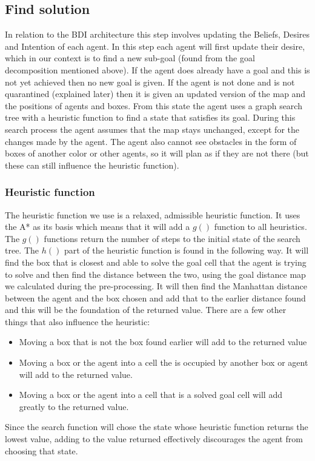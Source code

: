 \documentclass[letterpaper]{article}
\begin{document}
\subsection{Find solution}
In relation to the BDI architecture this step involves updating the Beliefs, Desires and Intention of each agent. In this step each agent will first update their desire, which in our context is to find a new sub-goal (found from the goal decomposition mentioned above). If the agent does already have a goal and this is not yet achieved then no new goal is given. If the agent is not done and is not quarantined (explained later) then it is given an updated version of the map and the positions of agents and boxes. From this state the agent uses a graph search tree with a heuristic function to find a state that satisfies its goal. During this search process the agent assumes that the map stays unchanged, except for the changes made by the agent. The agent also cannot see obstacles in the form of boxes of another color or other agents, so it will plan as if they are not there (but these can still influence the heuristic function).

\subsubsection{Heuristic function}
The heuristic function we use is a relaxed, admissible heuristic function. It uses the A* as its basis which means that it will add a $g()$ function to all heuristics. The $g()$ functions return the number of steps to the initial state of the search tree. The $h()$ part of the heuristic function is found in the following way. It will find the box that is closest and able to solve the goal cell that the agent is trying to solve and then find the distance between the two, using the goal distance map we calculated during the pre-processing. It will then find the Manhattan distance between the agent and the box chosen and add that to the earlier distance found and this will be the foundation of the returned value. There are a few other things that also influence the heuristic:
\begin{itemize}
\item Moving a box that is not the box found earlier will add to the returned value
\item Moving a box or the agent into a cell the is occupied by another box or agent will add to the returned value.
\item Moving a box or the agent into a cell that is a solved goal cell will add greatly to the returned value.
\end{itemize}
Since the search function will chose the state whose heuristic function returns the lowest value, adding to the value returned effectively discourages the agent from choosing that state.
\end{document}
